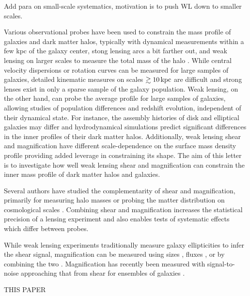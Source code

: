 \documentclass[12pt]{emulateapj}
\begin{document}
Add para on small-scale systematics, motivation is to push WL down to
smaller scales.

Various observational probes have been used to constrain the mass
profile of galaxies and dark matter halos, typically with dynamical
measurements within a few kpc of the galaxy center, stong lensing arcs
a bit farther out, and weak lensing on larger scales to measure the
total mass of the halo \citep[e.g.,][]{Sand2004, Koopmans2006,
  Gavazzi2007, Jiang2007, Auger2010, Schulz2010, Newman2013a}.  While
central velocity dispersions or rotation curves can be measured for
large samples of galaxies, detailed kinematic measures on scales
$\gtrsim10\,{\rm kpc}$ are difficult and strong lenses exist in only a sparse
sample of the galaxy population. Weak lensing, on the other hand, can
probe the average profile for large samples of galaxies, allowing
studies of population differences and redshift evolution, independent
of their dynamical state. For instance, the assembly histories of disk
and elliptical galaxies may differ and hydrodynamical simulations
predict significant differences in the inner profiles of their dark
matter halos. Additionally, weak lensing shear and magnification have
different scale-dependence on the surface mass density profile
providing added leverage in constraining its shape. The aim of this
letter is to investigate how well weak lensing shear and magnification
can constrain the inner mass profile of dark matter halos and
galaxies.

Several authors have studied the complementarity of shear and
magnification, primarily for measuring halo masses
\citep{Bartelmann1996, Bridle1998, Schneider2000, vanWaerbeke2010b,
  Rozo2010, Umetsu2011} or probing the matter distribution on
cosmological scales \citep{vanWaerbeke2010a, Casaponsa2013,
  Duncan2013, Krause2013}. Combining shear and magnification increases
the statistical precision of a lensing experiment and also enables
tests of systematic effects which differ between probes.

While weak lensing experiments traditionally measure galaxy
ellipticities to infer the shear signal, magnification can be measured
using sizes \citep{Bartelmann1995}, fluxes \citep{Broadhurst1995}, or
by combining the two \citep{Huff2011, Schmidt2012}. Magnification has
recently been measured with signal-to-noise approaching that from
shear for ensembles of galaxies \citep{Scranton2005, Hildebrandt2009,
  Menard2010, Huff2011, Ford2012, Schmidt2012}.

THIS PAPER
\end{document}

